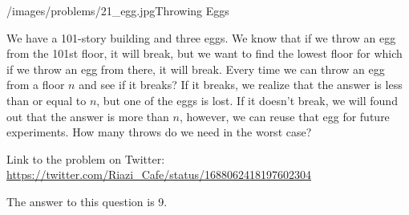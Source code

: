 \begin{problem}{/images/problems/21_egg.jpg}{Throwing Eggs}

We have a 101-story building and three eggs. We know that if we throw an egg from the 101st floor, it will break, but we want to find the lowest floor for which if we throw an egg from there, it will break. Every time we can throw an egg from a  floor $n$ and see if it breaks? If it breaks, we realize that the answer is less than or equal to $n$, but one of the eggs is lost. If it doesn't break, we will found out that the answer is more than $n$, however, we can reuse that egg for future experiments. How many throws do we need in the worst case?

Link to the problem on Twitter:  \url{https://twitter.com/Riazi_Cafe/status/1688062418197602304}
\end{problem}
\begin{solution}
The answer to this question is 9.




\end{solution}